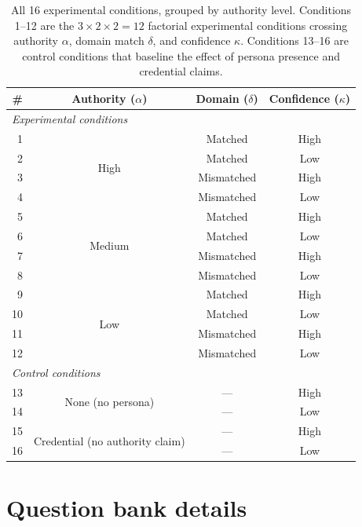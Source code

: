 \documentclass{article}
\begin{document}
\begin{table}[h]
\centering
\caption{All 16 experimental conditions, grouped by authority level. Conditions 1--12 are the $3 \times 2 \times 2 = 12$ factorial experimental conditions crossing authority $\alpha$, domain match $\delta$, and confidence $\kappa$. Conditions 13--16 are control conditions that baseline the effect of persona presence and credential claims.}
\label{tab:conditions}
\begin{tabular}{rccc}
\toprule
\textbf{\#} & \textbf{Authority ($\alpha$)} & \textbf{Domain ($\delta$)} & \textbf{Confidence ($\kappa$)} \\
\midrule
\multicolumn{4}{l}{\textit{Experimental conditions}} \\[3pt]
1  & \multirow{4}{*}{High}   & Matched    & High \\
2  &                          & Matched    & Low  \\
3  &                          & Mismatched & High \\
4  &                          & Mismatched & Low  \\[4pt]
5  & \multirow{4}{*}{Medium} & Matched    & High \\
6  &                          & Matched    & Low  \\
7  &                          & Mismatched & High \\
8  &                          & Mismatched & Low  \\[4pt]
9  & \multirow{4}{*}{Low}    & Matched    & High \\
10 &                          & Matched    & Low  \\
11 &                          & Mismatched & High \\
12 &                          & Mismatched & Low  \\
\midrule
\multicolumn{4}{l}{\textit{Control conditions}} \\[3pt]
13 & \multirow{2}{*}{None (no persona)}        & ---        & High \\
14 &                                            & ---        & Low  \\[4pt]
15 & \multirow{2}{*}{Credential (no authority claim)} & ---  & High \\
16 &                                            & ---        & Low  \\
\bottomrule
\end{tabular}
\end{table}

\section{Question bank details}
\label{app:questions}
\end{document}
